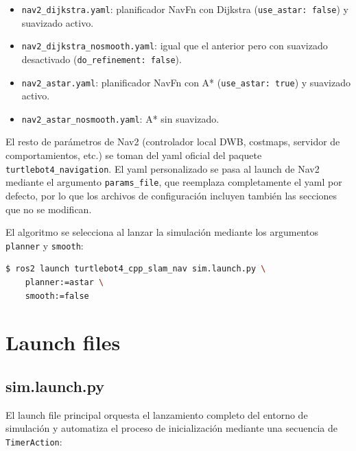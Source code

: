 \begin{itemize}
    \item \texttt{nav2\_dijkstra.yaml}: planificador NavFn con Dijkstra (\texttt{use\_astar: false}) y suavizado activo.
    \item \texttt{nav2\_dijkstra\_nosmooth.yaml}: igual que el anterior pero con suavizado desactivado (\texttt{do\_refinement: false}).
    \item \texttt{nav2\_astar.yaml}: planificador NavFn con A* (\texttt{use\_astar: true}) y suavizado activo.
    \item \texttt{nav2\_astar\_nosmooth.yaml}: A* sin suavizado.
\end{itemize}

El resto de parámetros de Nav2 (controlador local DWB, costmaps, servidor de comportamientos, etc.) se toman del yaml oficial del paquete \texttt{turtlebot4\_navigation}. El yaml personalizado se pasa al launch de Nav2 mediante el argumento \texttt{params\_file}, que reemplaza completamente el yaml por defecto, por lo que los archivos de configuración incluyen también las secciones que no se modifican.

El algoritmo se selecciona al lanzar la simulación mediante los argumentos \texttt{planner} y \texttt{smooth}:

\begin{lstlisting}[language=bash, basicstyle=\ttfamily\small, backgroundcolor=\color{gray!15}, frame=single]
$ ros2 launch turtlebot4_cpp_slam_nav sim.launch.py \
    planner:=astar \
    smooth:=false
\end{lstlisting}


\section{Launch files}

\subsection{sim.launch.py}

El launch file principal orquesta el lanzamiento completo del entorno de simulación y automatiza el proceso de inicialización mediante una secuencia de \texttt{TimerAction}:

